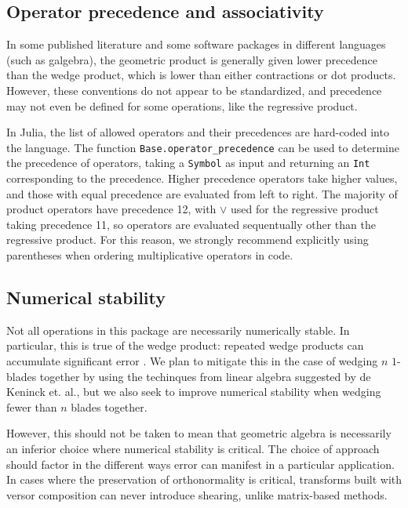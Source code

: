 \documentclass{juliacon}
\begin{document}
\subsection{Operator precedence and associativity}

In some published literature \cite{GA4P}\cite{CA2GC} and some software packages in different languages (such as galgebra)\cite{galgebra}, the geometric product is generally given lower precedence than the wedge product, which is lower than either contractions or dot products. 
However, these conventions do not appear to be standardized, and precedence may not even be defined for some operations, like the regressive product.

In Julia, the list of allowed operators and their precedences are hard-coded into the language.
The function \texttt{Base.operator_precedence} can be used to determine the precedence of operators, taking a \texttt{Symbol} as input and returning an \texttt{Int} corresponding to the precedence.
Higher precedence operators take higher values, and those with equal precedence are evaluated from left to right.
The majority of product operators have precedence 12, with $\vee$ used for the regressive product taking precedence 11, so operators are evaluated sequentually other than the regressive product.
For this reason, we strongly recommend explicitly using parentheses when ordering multiplicative operators in code.

\subsection{Numerical stability}

Not all operations in this package are necessarily numerically stable.
In particular, this is true of the wedge product: repeated wedge products can accumulate significant error \cite{de_keninck_hyperwedge_2020}.
We plan to mitigate this in the case of wedging $n$ $1$-blades together by using the techinques from linear algebra suggested by de Keninck et. al., but we also seek to improve numerical stability when wedging fewer than $n$ blades together.

However, this should not be taken to mean that geometric algebra is necessarily an inferior choice where numerical stability is critical.
The choice of approach should factor in the different ways error can manifest in a particular application.
In cases where the preservation of orthonormality is critical, transforms built with versor composition can never introduce shearing, unlike matrix-based methods.
\end{document}
